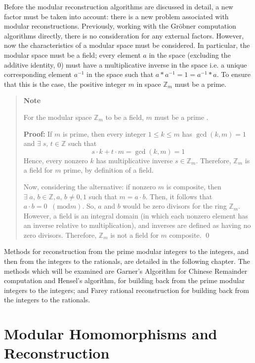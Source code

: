 \documentclass[letterpaper,12pt,titlepage,oneside,final]{book}
\newenvironment{note}{\begin{quote}%
  \textbf{Note }%
  \quad
}{%
\end{quote}%
}
\begin{document}
Before the modular reconstruction algorithms are discussed in detail, a new factor must be taken into account: there is a new problem associated with modular reconstructions.  Previously, working with the Gr\"obner computation algorithms directly, there is no consideration for any external factors.  However, now the characteristics of a modular space must be considered.  In particular, the modular space must be a field; every element ${a}$ in the space (excluding the additive identity, 0) must have a multiplicative inverse in the space i.e. a unique corresponding element ${a^{-1}}$ in the space such that ${a*a^{-1} = 1 = a^{-1}*a}$.  To ensure that this is the case, the positive integer ${m}$ in space ${\mathbb{Z}_m}$ must be a prime.

\begin{note}
  For the modular space ${\mathbb{Z}_m}$ to be a field, ${m}$ must be a prime \cite{Durbin}.  

  \textbf{Proof:} If ${m}$ is prime, then every integer ${1 \leq k \leq m}$ has ${\gcd(k, m) = 1}$ and ${\exists \; s, \, t \in \mathbb{Z}}$ such that 
  \begin{equation*}
    s \cdot k + t \cdot m = \gcd(k, m) = 1
  \end{equation*}
  Hence, every nonzero ${k}$ has multiplicative inverse ${s \in \mathbb{Z}_m}$.  Therefore, ${\mathbb{Z}_m}$ is a field for ${m}$ prime, by definition of a field.

  Now, considering the alternative: if nonzero ${m}$ is composite, then ${\exists \; a, \, b \in \mathbb{Z}, a, \, b \neq 0, 1}$ such that ${m = a \cdot b}$.  Then, it follows that ${a \cdot b = 0 \;\;(\textrm{mod} m)}$.  So, ${a}$ and ${b}$ would be zero divisors for the ring ${\mathbb{Z}_m}$.  However, a field is an integral domain (in which each nonzero element has an inverse relative to multiplication), and inverses are defined as having no zero divisors.  Therefore, ${\mathbb{Z}_m}$ is not a field for ${m}$ composite. \qed
\end{note} 

Methods for reconstruction from the prime modular integers to the integers, and then from the integers to the rationals, are detailed in the following chapter.  The methods which will be examined are Garner's Algorithm for Chinese Remainder computation and Hensel's algorithm, for building back from the prime modular integers to the integers; and Farey rational reconstruction for building back from the integers to the rationals.

\chapter{Modular Homomorphisms and Reconstruction}
\end{document}

